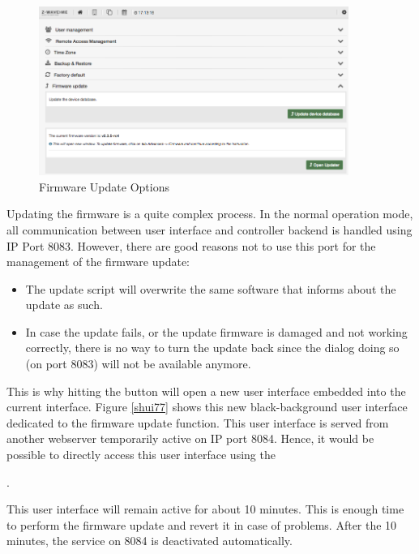 \begin{figure}
\begin{center}
\includegraphics[width=0.9\textwidth]{pngs/cap4/shui76.png}
\caption{Firmware Update Options}
\label{shui76}
\end{center}
\end{figure}

Updating the firmware is a quite complex process. In the normal operation mode, all 
communication between user interface and controller backend is handled using IP Port 8083. 
However, there are good reasons not to use this port for the management of the firmware update:

\begin{itemize}
\item The update script will overwrite the same software that informs about the update as such.
\item In case the update fails, or the update firmware is damaged and not working correctly, 
there is no way to turn the update back since the dialog doing so (on port 8083) will not 
be available anymore.
\end{itemize}

This is why hitting the button  will open a new user interface embedded 
into the current interface. Figure \ref{shui77} shows this new black-background user 
interface dedicated to the firmware update function. This user interface is served from 
another webserver temporarily active on IP port 8084. Hence, it would be possible to 
directly access this user interface using the


.


This user interface will remain active for about 10 minutes. This is enough time to perform
 the firmware update and revert it in case of problems. After the 10 minutes, the service on 
 8084 is deactivated automatically.

